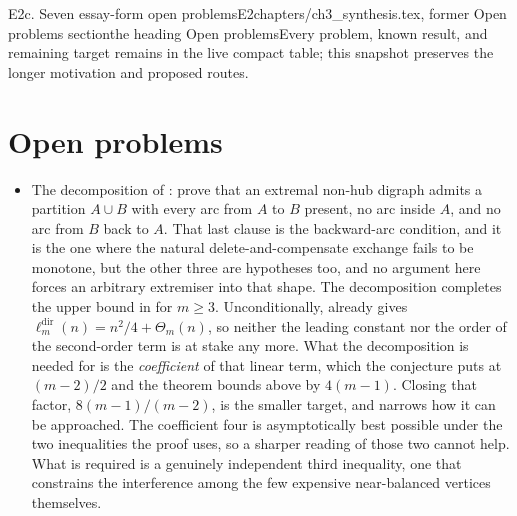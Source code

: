 \begin{offcut}{E2c. Seven essay-form open problems}{E2}{chapters/ch3\_synthesis.tex, former Open problems section}{the heading Open problems}{Every problem, known result, and remaining target remains in the live compact table; this snapshot preserves the longer motivation and proposed routes.}
\section{Open problems}

\begin{itemize}
    \item The decomposition of : prove that an extremal non-hub digraph admits a partition $A \cup B$ with every arc from $A$ to $B$ present, no arc inside $A$, and no arc from $B$ back to $A$. That last clause is the backward-arc condition, and it is the one where the natural delete-and-compensate exchange fails to be monotone, but the other three are hypotheses too, and no argument here forces an arbitrary extremiser into that shape. The decomposition completes the upper bound in  for $m \ge 3$. Unconditionally,  already gives $\ell_m^{\mathrm{dir}}(n) = n^2/4 + \Theta_m(n)$, so neither the leading constant nor the order of the second-order term is at stake any more. What the decomposition is needed for is the \emph{coefficient} of that linear term, which the conjecture puts at $(m-2)/2$ and the theorem bounds above by $4(m-1)$. Closing that factor, $8(m-1)/(m-2)$, is the smaller target, and  narrows how it can be approached. The coefficient four is asymptotically best possible under the two inequalities the proof uses, so a sharper reading of those two cannot help. What is required is a genuinely independent third inequality, one that constrains the interference among the few expensive near-balanced vertices themselves.

\end{itemize}
\end{offcut}

